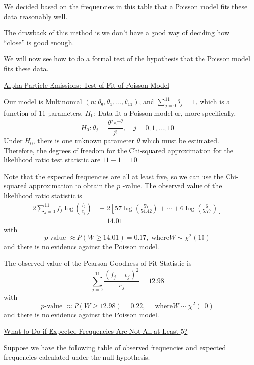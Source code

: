 We decided based on the frequencies in this table that a Poisson model fits these data
reasonably well.

The drawback of this method is we don't have a good way of deciding how ``close'' is good enough.

We will now see how to do a formal test of the hypothesis that the Poisson model fits these data.

\underline{Alpha-Particle Emissions: Test of Fit of Poisson Model}

Our model is Multinomial $\left(n ; \theta_{0}, \theta_{1}, \ldots, \theta_{11}\right)$, and $\sum_{j=0}^{11} \theta_{j}=1$, which is a function of 11 parameters.
$H_{0}$: Data fit a Poisson model or, more specifically,
\[
    H_{0}: \theta_{j}=\frac{\theta^{j} e^{-\theta}}{j !}, \quad j=0,1, \ldots, 10
\]
Under $H_{0}$, there is one unknown parameter $\theta$ which must be estimated.
Therefore, the degrees of freedom for the Chi-squared approximation for the likelihood ratio test statistic are $11-1=10$

Note that the expected frequencies are all at least five, so we can use the Chi-squared approximation to obtain the $p$ -value.
The observed value of the likelihood ratio statistic is
\[
    \begin{aligned}
        2 \sum_{j=0}^{11} f_{j} \log \left(\frac{f_{j}}{e_{j}}\right) & =2\left[57 \log \left(\frac{57}{54.42}\right)+\cdots+6 \log \left(\frac{6}{5.77}\right)\right] \\
                                                                      & =14.01
    \end{aligned}
\]
with
\[
    p \text{-value } \approx P(W \geq 14.01)=0.17, \text{ where} W \sim \chi^{2}(10)
\]
and there is no evidence against the Poisson model.

The observed value of the Pearson Goodness of Fit Statistic is
\[
    \sum_{j=0}^{11} \frac{\left(f_{j}-e_{j}\right)^{2}}{e_{j}}=12.98
\]
with
\[
    p \text{-value } \approx P(W \geq 12.98)=0.22, \quad \text{ where} W \sim \chi^{2}(10)
\]
and there is no evidence against the Poisson model.

\underline{What to Do if Expected Frequencies Are Not All at Least $ 5 $?}

Suppose we have the following table of observed frequencies and expected frequencies calculated
under the null hypothesis.

